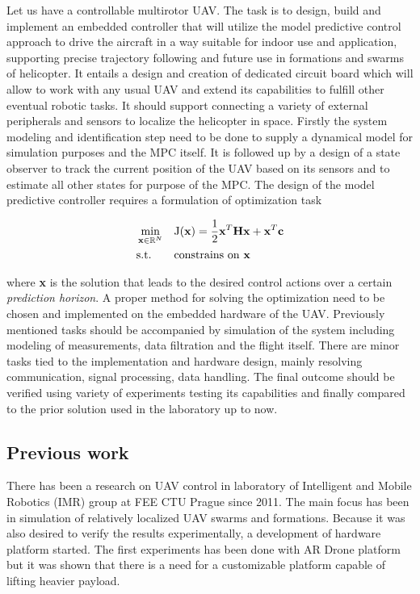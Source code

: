 Let us have a controllable multirotor UAV. The task is to design, build and implement an embedded controller that will utilize the model predictive control approach to drive the aircraft in a way suitable for indoor use and application, supporting precise trajectory following and future use in formations and swarms of helicopter. It entails a design and creation of dedicated circuit board which will allow to work with any usual UAV and extend its capabilities to fulfill other eventual robotic tasks. It should support connecting a variety of external peripherals and sensors to localize the helicopter in space. Firstly the system modeling and identification step need to be done to supply a dynamical model for simulation purposes and the MPC itself. It is followed up by a design of a state observer to track the current position of the UAV based on its sensors and to estimate all other states for purpose of the MPC. The design of the model predictive controller requires a formulation of optimization task

\begin{equation}
\label{eq:qmpc_intro}
\begin{aligned}
& \min_{\textbf{x} \in \mathbb{R}^{N}}
& & \mathrm{J}(\textbf{x}) = \frac{1}{2}\textbf{x}^T\textbf{H}\textbf{x} + \textbf{x}^T\textbf{c}\\
& \text{s.t.}
& & \text{constrains on \textbf{x}}
\end{aligned}
\end{equation}

where \textbf{x} is the solution that leads to the desired control actions over a certain \emph{prediction horizon}. A proper method for solving the optimization need to be chosen and implemented on the embedded hardware of the UAV. Previously mentioned tasks should be accompanied by simulation of the system including modeling of measurements, data filtration and the flight itself. There are minor tasks tied to the implementation and hardware design, mainly resolving communication, signal processing, data handling. The final outcome should be verified using variety of experiments testing its capabilities and finally compared to the prior solution used in the laboratory up to now.

\subsection{Previous work}
\label{cap:prior_work}

There has been a research on UAV control in laboratory of Intelligent and Mobile Robotics (IMR) group at FEE CTU Prague since 2011. The main focus has been in simulation of relatively localized UAV swarms and formations. Because it was also desired to verify the results experimentally, a development of hardware platform started. The first experiments has been done with AR Drone platform \citep{kranik2012drone} but it was shown that there is a need for a customizable platform capable of lifting heavier payload.

